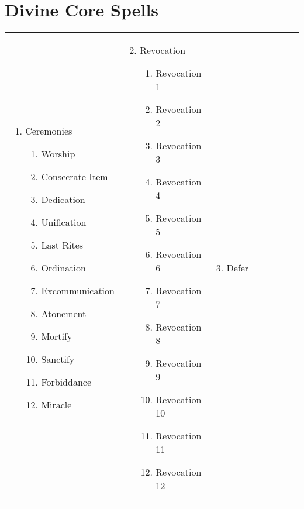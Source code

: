 \section{Divine Core Spells}
\renewcommand{\labelenumii}{\arabic{enumii}.}
\begin{tabular}{@{} p{0.25\linewidth} p{0.25\linewidth} p{0.25\linewidth} p{0.25\linewidth}}
\begin{enumerate}
	\item Ceremonies
	\begin{enumerate}
		\item Worship
		\item Consecrate Item
		\item Dedication
		\item Unification
		\item Last Rites
		\item Ordination
		\item Excommunication
		\item Atonement
		\item Mortify
		\item Sanctify
		\item Forbiddance
		\item Miracle
	\end{enumerate}
\end{enumerate} &
\begin{enumerate}
	\setcounter{enumi}{1}
	\item Revocation
	\begin{enumerate}
		\item Revocation 1
		\item Revocation 2
		\item Revocation 3
		\item Revocation 4
		\item Revocation 5
		\item Revocation 6
		\item Revocation 7
		\item Revocation 8
		\item Revocation 9
		\item Revocation 10
		\item Revocation 11
		\item Revocation 12
	\end{enumerate}
\end{enumerate} &
\begin{enumerate}
	\setcounter{enumi}{2}
	\item Defer
	\begin{enumerate}

\end{enumerate}
\end{enumerate}
\end{tabular}

